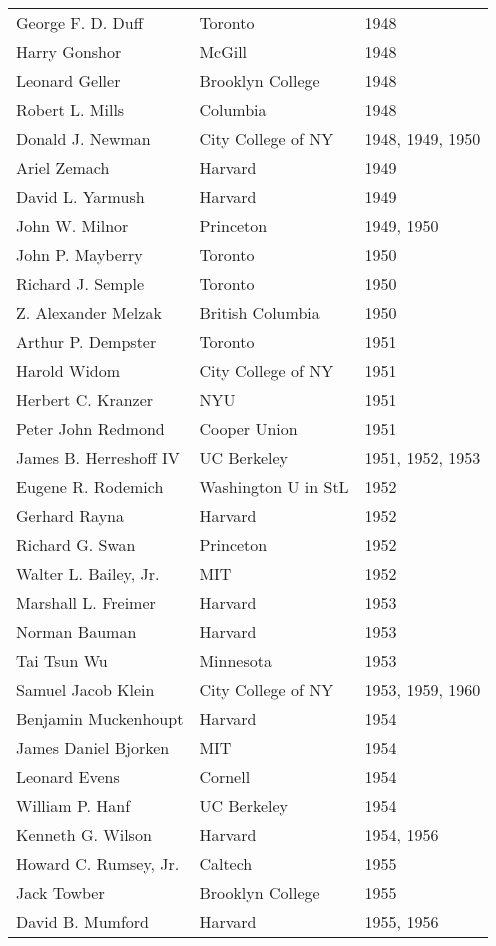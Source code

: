 \documentclass[12pt]{article}
\begin{document}
\begin{tabular}{|l|l|l|}
George F. D. Duff & Toronto & 1948 \\
Harry Gonshor & McGill & 1948 \\
Leonard Geller & Brooklyn College & 1948 \\
Robert L. Mills & Columbia & 1948 \\
Donald J. Newman & City College of NY & 1948, 1949, 1950 \\
Ariel Zemach & Harvard & 1949 \\
David L. Yarmush & Harvard & 1949 \\
John W. Milnor & Princeton & 1949, 1950 \\
John P. Mayberry & Toronto & 1950 \\
Richard J. Semple & Toronto & 1950 \\
Z. Alexander Melzak & British Columbia & 1950 \\
Arthur P. Dempster & Toronto & 1951 \\
Harold Widom & City College of NY & 1951 \\
Herbert C. Kranzer & NYU & 1951 \\
Peter John Redmond & Cooper Union & 1951 \\
James B. Herreshoff IV & UC Berkeley & 1951, 1952, 1953 \\
Eugene R. Rodemich & Washington U in StL & 1952 \\
Gerhard Rayna & Harvard & 1952 \\
Richard G. Swan & Princeton & 1952 \\
Walter L. Bailey, Jr. & MIT & 1952 \\
Marshall L. Freimer & Harvard & 1953 \\
Norman Bauman & Harvard & 1953 \\
Tai Tsun Wu & Minnesota & 1953 \\
Samuel Jacob Klein & City College of NY & 1953, 1959, 1960 \\
Benjamin Muckenhoupt & Harvard & 1954 \\
James Daniel Bjorken & MIT & 1954 \\
Leonard Evens & Cornell & 1954 \\
William P. Hanf & UC Berkeley & 1954 \\
Kenneth G. Wilson & Harvard & 1954, 1956 \\
Howard C. Rumsey, Jr. & Caltech & 1955 \\
Jack Towber & Brooklyn College & 1955 \\
David B. Mumford & Harvard & 1955, 1956 \\

\end{tabular}
\end{document}
